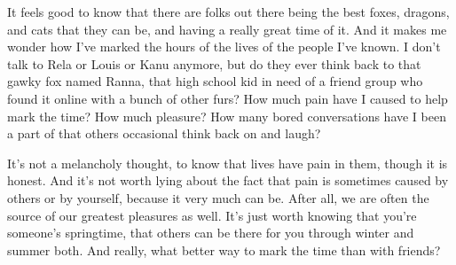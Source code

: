 It feels good to know that there are folks out there being the best
foxes, dragons, and cats that they can be, and having a really great
time of it. And it makes me wonder how I've marked the hours of the
lives of the people I've known. I don't talk to Rela or Louis or Kanu
anymore, but do they ever think back to that gawky fox named Ranna, that
high school kid in need of a friend group who found it online with a
bunch of other furs? How much pain have I caused to help mark the time?
How much pleasure? How many bored conversations have I been a part of
that others occasional think back on and laugh?

It's not a melancholy thought, to know that lives have pain in them,
though it is honest. And it's not worth lying about the fact that pain
is sometimes caused by others or by yourself, because it very much can
be. After all, we are often the source of our greatest pleasures as
well. It's just worth knowing that you're someone's springtime, that
others can be there for you through winter and summer both. And really,
what better way to mark the time than with friends?
